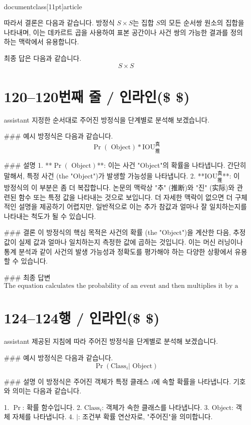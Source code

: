 \\documentclass[11pt]{article}
\begin{document}
따라서 결론은 다음과 같습니다.
방정식 \( S \times S \)는 집합 \( S \)의 모든 순서쌍 원소의 집합을 나타내며, 이는 데카르트 곱을 사용하여 표본 공간이나 사건 쌍의 가능한 결과를 정의하는 맥락에서 유용합니다.

최종 답은 다음과 같습니다.
\[
\boxed{S \times S}
\]

\section*{120–120번째 줄 / 인라인(\$ \$) }
assistant
지정한 순서대로 주어진 방정식을 단계별로 분석해 보겠습니다.

### 예시
방정식은 다음과 같습니다.
\[
\Pr(\textrm{ Object}) * \textrm{IOU}_{\textrm{推}}^{\textrm{真}}
\]

### 설명
1. **\(\Pr(\textrm{ Object})\)**: 이는 사건 "Object"의 확률을 나타냅니다. 간단히 말해서, 특정 사건 (the "Object")가 발생할 가능성을 나타냅니다.
2. **\(\textrm{IOU}_{\textrm{推}}^{\textrm{真}}\)**: 이 방정식의 이 부분은 좀 더 복잡합니다. 논문의 맥락상 "추" (推断)와 "진" (实际)와 관련된 함수 또는 특정 값을 나타내는 것으로 보입니다. 더 자세한 맥락이 없으면 더 구체적인 설명을 제공하기 어렵지만, 일반적으로 이는 추가 참값과 얼마나 잘 일치하는지를 나타내는 척도가 될 수 있습니다.

### 결론
이 방정식의 핵심 목적은 사건의 확률 (the "Object")을 계산한 다음, 추정값이 실제 값과 얼마나 일치하는지 측정한 값에 곱하는 것입니다. 이는 머신 러닝이나 통계 분석과 같이 사건의 발생 가능성과 정확도를 평가해야 하는 다양한 상황에서 유용할 수 있습니다.

### 최종 답변
\[
\boxed{\text{The equation calculates the probability of an event and then multiplies it by a measure of how well a推ulation matches the true value.}}
\]

\section*{124–124행 / 인라인(\$ \$) }
assistant
제공된 지침에 따라 주어진 방정식을 단계별로 분석해 보겠습니다.

### 예시
방정식은 다음과 같습니다.
\[
\Pr(\textrm{Class}_i | \textrm{ Object})
\]

### 설명
이 방정식은 주어진 객체가 특정 클래스 \(i\)에 속할 확률을 나타냅니다. 기호와 의미는 다음과 같습니다.

1. \(\Pr\): 확률 함수입니다.
2. \(\textrm{Class}_i\): 객체가 속한 클래스를 나타냅니다.
3. \(\textrm{Object}\): 객체 자체를 나타냅니다.
4. \(|\): 조건부 확률 연산자로, "주어진"을 의미합니다.
\end{document}
